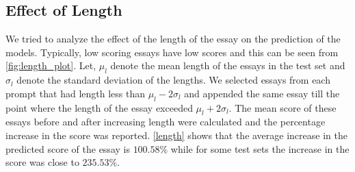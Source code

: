 \documentclass[11pt,a4paper]{article}
\begin{document}
\subsection{Effect of Length}

We tried to analyze the effect of the length of the essay on the prediction of the models. Typically, low scoring essays have low scores and this can be seen from \cref{fig:length_plot}. Let, $\mu_l$ denote the mean length of the essays in the test set and $\sigma_l$ denote the standard deviation of the lengths. We selected essays from each prompt that had length less than $\mu_l - 2\sigma_l$ and appended the same essay till the point where the length of the essay exceeded $\mu_l + 2\sigma_l$. The mean score of these essays before and after increasing length were calculated and the percentage increase in the score was reported. \cref{length} shows that the average increase in the predicted score of the essay is $100.58\%$ while for some test sets the increase in the score was close to $235.53\%$. 
\end{document}
